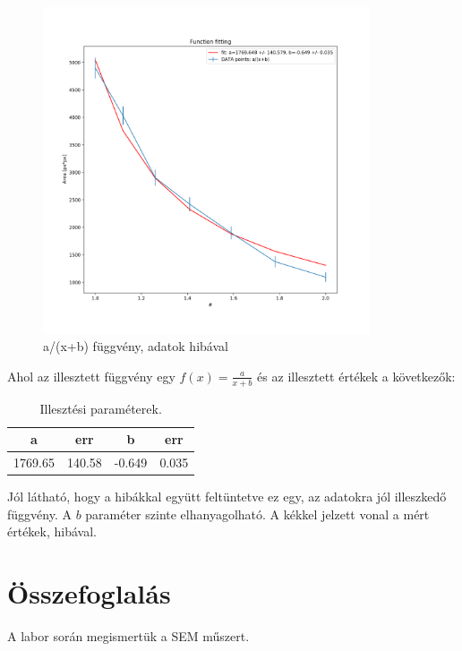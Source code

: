 \documentclass[a4paper,12pt]{article}
\begin{document}
\begin{figure}[H]
	\centering
	\includegraphics[width=0.86\textwidth]{./egyperxfuggvenyhiba.png}
	\caption{a/(x+b) függvény, adatok hibával}
\end{figure}

\par Ahol az illesztett függvény egy $f(x) = \frac{a}{x + b}$ és az illesztett értékek 
a következők:

\begin{table}[H]
	\centering
	\begin{tabular}{|c|c|c|c|} \hline
		a & err & b &  err\\ \hline
		1769.65 & 140.58 & -0.649  & 0.035 \\ \hline
	\end{tabular}
	\caption{Illesztési paraméterek.}
\end{table}

\par Jól látható, hogy a hibákkal együtt feltüntetve ez egy, az adatokra
jól illeszkedő függvény. A $b$ paraméter szinte elhanyagolható. A kékkel jelzett 
vonal a mért értékek, hibával.

\section{ Összefoglalás}

\par A labor során megismertük a SEM műszert.
\end{document}
